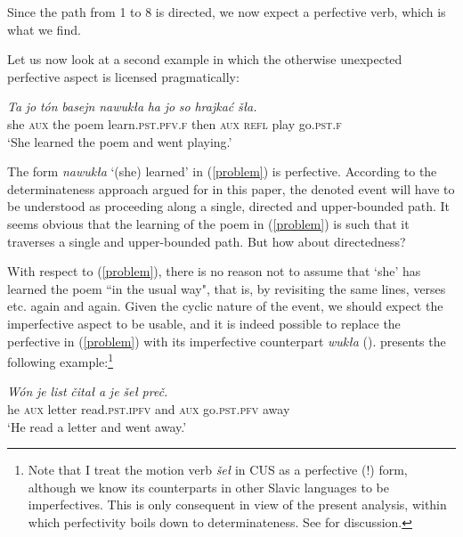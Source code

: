 \documentclass[output=paper,colorlinks,citecolor=brown]{langscibook}
\begin{document}
\noindent Since the path from 1 to 8 is directed, we now expect a perfective verb, which is what we find. 

Let us now look at a second example in which the otherwise unexpected perfective aspect is licensed pragmatically:

  \ea\label{problem}
\gll \textit{Ta} \textit{jo} \textit{t\'on} \textit{basejn} \textit{nawuk\l{a}} \textit{ha} \textit{jo} \textit{so} \textit{hrajka\'c} \textit{š\l{a}.} \\
she \textsc{aux} the poem learn.\textsc{pst.pfv.f} then \textsc{aux} \textsc{refl} play go.\textsc{pst.f}\\
\glt \normalsize{`She learned the poem and went playing.'}
\z

\noindent The form \textit{nawuk\l{a}} `(she) learned' in (\ref{problem}) is perfective. According to the determinateness approach argued for in this paper, the denoted event will have to be understood as proceeding along a single, directed and upper-bounded path. It seems obvious that the learning of the poem in (\ref{problem}) is such that it traverses a single and upper-bounded path. But how about directedness? 

With respect to (\ref{problem}), there is no reason not to assume that `she' has learned the poem ``in the usual way", that is, by revisiting the same lines, verses etc. again and again. Given the cyclic nature of the event, we should expect the imperfective aspect to be usable, and it is indeed possible to replace the perfective in (\ref{problem}) with its imperfective counterpart \textit{wuk\l{a}} (\citealt[245]{Scholze2008}). \citet{Werner2013} presents the following example:\footnote{Note that I treat the motion verb \textit{še\l{}} in CUS as a perfective (!) form, although we know its counterparts in other Slavic languages to be imperfectives.
This is only consequent in view of the present analysis, within which perfectivity boils down to determinateness. See \citet[282]{Scholze2008} for discussion.}

  \ea\label{nocheen}
\gll \textit{W\'on} \textit{je} \textit{list} \textit{\v{c}ita\l{}} \textit{a} \textit{je} \textit{še\l{}} \textit{pre\v{c}.} \\
he \textsc{aux} letter read.\textsc{pst.ipfv} and \textsc{aux} go.\textsc{pst.pfv} away\\
\glt \normalsize{`He read a letter and went away.'}
\z
\end{document}
